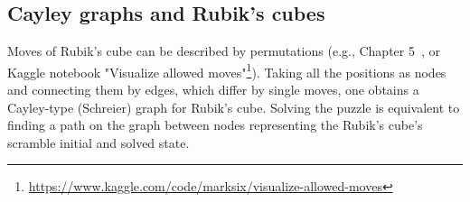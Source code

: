 
\subsection{\label{sec_cg_cube}Cayley graphs and Rubik's cubes}

Moves of Rubik's cube can be described by permutations (e.g., Chapter 5~\cite{mulholland2016permutation}, or  Kaggle notebook "Visualize allowed moves"\footnote{\url{https://www.kaggle.com/code/marksix/visualize-allowed-moves}}). Taking all the positions as nodes and connecting them by edges, which differ by single moves, one obtains a Cayley-type (Schreier) graph for Rubik's cube. Solving the puzzle is equivalent to finding a path on the graph between nodes representing the Rubik's cube's scramble initial and solved state. 
